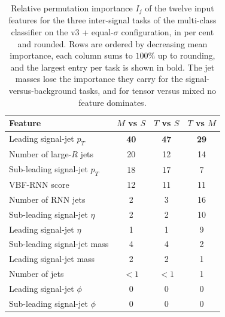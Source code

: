 \begin{table}[htbp]
  \centering
  \caption{Relative permutation importance $I_j$ of the twelve input features for the three inter-signal tasks of the multi-class classifier on the v3 + equal-$\sigma$ configuration, in per cent and rounded. Rows are ordered by decreasing mean importance, each column sums to $100\%$ up to rounding, and the largest entry per task is shown in bold. The jet masses lose the importance they carry for the signal-versus-background tasks, and for tensor versus mixed no feature dominates.}
  \label{tab:fr_rank_mc_sig}
  \begin{tabular}{|l|c|c|c|}
    \hline
    \textbf{Feature} & \textbf{$M$ vs $S$} & \textbf{$T$ vs $S$} & \textbf{$T$ vs $M$} \\
    \hline
    Leading signal-jet $p_T$      & \textbf{40} & \textbf{47} & \textbf{29} \\
    Number of large-$R$ jets      & 20 & 12 & 14 \\
    Sub-leading signal-jet $p_T$  & 18 & 17 & 7 \\
    VBF-RNN score                 & 12 & 11 & 11 \\
    Number of RNN jets            & 2  & 3  & 16 \\
    Sub-leading signal-jet $\eta$ & 2  & 2  & 10 \\
    Leading signal-jet $\eta$     & 1  & 1  & 9 \\
    Sub-leading signal-jet mass   & 4  & 4  & 2 \\
    Leading signal-jet mass       & 2  & 2  & 1 \\
    Number of jets                & $<1$ & $<1$ & 1 \\
    Leading signal-jet $\phi$     & 0  & 0  & 0 \\
    Sub-leading signal-jet $\phi$ & 0  & 0  & 0 \\
    \hline
  \end{tabular}
\end{table}

